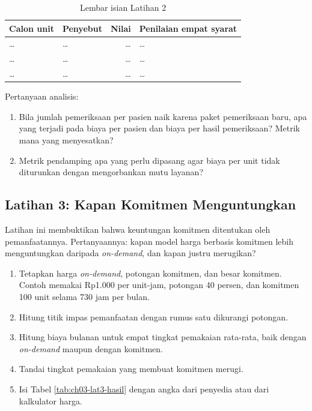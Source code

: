 \begin{table}[!htb]
  \centering
  \caption{Lembar isian Latihan 2}
  \label{tab:ch03-lat2-hasil}
  \footnotesize
  \begin{tabularx}{\textwidth}{>{\raggedright\arraybackslash}p{2.6cm} >{\raggedright\arraybackslash}p{2.3cm} r >{\raggedright\arraybackslash}X}
    \hline
    \textbf{Calon unit} & \textbf{Penyebut} & \textbf{Nilai} & \textbf{Penilaian empat syarat} \\
      \hline
    \dots & \dots & \dots & \dots \\ \hline
    \dots & \dots & \dots & \dots \\ \hline
    \dots & \dots & \dots & \dots \\ \hline
  \end{tabularx}
\end{table}

Pertanyaan analisis:
\begin{enumerate}
  \item Bila jumlah pemeriksaan per pasien naik karena paket pemeriksaan baru, apa yang terjadi pada
        biaya per pasien dan biaya per hasil pemeriksaan? Metrik mana yang menyesatkan?
  \item Metrik pendamping apa yang perlu dipasang agar biaya per unit tidak diturunkan dengan
        mengorbankan mutu layanan?
\end{enumerate}

\subsection*{Latihan 3: Kapan Komitmen Menguntungkan}

Latihan ini membuktikan bahwa keuntungan komitmen ditentukan oleh pemanfaatannya. Pertanyaannya:
kapan model harga berbasis komitmen lebih menguntungkan daripada \textit{on-demand}, dan kapan
justru merugikan?

\begin{enumerate}
  \item Tetapkan harga \textit{on-demand}, potongan komitmen, dan besar komitmen. Contoh memakai
        Rp1.000 per unit-jam, potongan 40 persen, dan komitmen 100 unit selama 730 jam per bulan.
  \item Hitung titik impas pemanfaatan dengan rumus satu dikurangi potongan.
  \item Hitung biaya bulanan untuk empat tingkat pemakaian rata-rata, baik dengan \textit{on-demand}
        maupun dengan komitmen.
  \item Tandai tingkat pemakaian yang membuat komitmen merugi.
  \item Isi Tabel \ref{tab:ch03-lat3-hasil} dengan angka dari penyedia atau dari kalkulator harga.
\end{enumerate}

